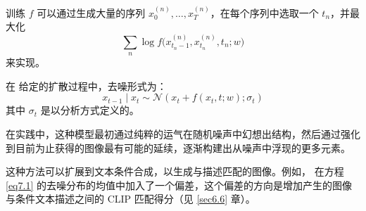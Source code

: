 训练 $f$ 可以通过生成大量的序列 $x_0^{(n)}, \dots , x_T^{(n)}$，在每个序列中选取一个 $t_n$，并最大化 
\[\sum_{n} \log f\Big(x_{t_n-1}^{(n)}, x_{t_n}^{(n)}, t_n; w\Big)\]
来实现。

在 \cite{arxiv-2006.11239} 给定的扩散过程中，去噪形式为：
\begin{equation}
    x_{t-1} \mid x_t \sim \mathcal{N} (x_t + f(x_t,t;w);\sigma_t) \label{eq7.1}
\end{equation}
其中 $\sigma_t$ 是以分析方式定义的。

在实践中，这种模型最初通过纯粹的运气在随机噪声中幻想出结构，然后通过强化到目前为止获得的图像最有可能的延续，逐渐构建出从噪声中浮现的更多元素。

这种方法可以扩展到文本条件合成，以生成与描述匹配的图像。例如，\cite{arxiv-2112.10741} 在方程 \ref{eq7.1} 的去噪分布的均值中加入了一个偏差，这个偏差的方向是增加产生的图像与条件文本描述之间的 CLIP 匹配得分（见 \ref{sec6.6} 章）。
